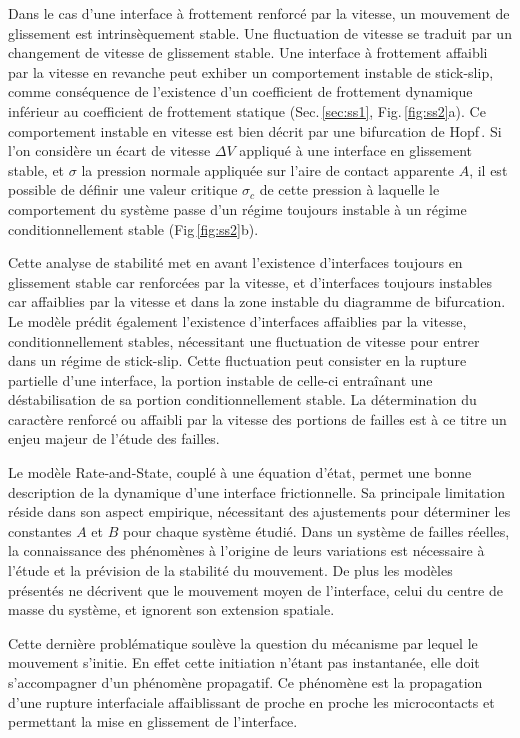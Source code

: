 Dans le cas d'une interface à frottement renforcé par la vitesse, un mouvement de glissement est intrinsèquement stable. Une fluctuation de vitesse se traduit par un changement de vitesse de glissement stable. Une interface à frottement affaibli par la vitesse en revanche peut exhiber un comportement instable de stick-slip, comme conséquence de l'existence d'un coefficient de frottement dynamique inférieur au coefficient de frottement statique (Sec.\,\ref{sec:ss1}, Fig.\,\ref{fig:ss2}a). Ce comportement instable en vitesse est bien décrit par une bifurcation de Hopf\,\cite{rice_stability_1983,gu_slip_1984,heslot_creep_1994}. Si l'on considère un écart de vitesse $\Delta V$ appliqué à une interface en glissement stable, et $\sigma$ la pression normale appliquée sur l'aire de contact apparente $A$, il est possible de définir une valeur critique $\sigma_c$ de cette pression à laquelle le comportement du système passe d'un régime toujours instable à un régime conditionnellement stable (Fig\,\ref{fig:ss2}b).


Cette analyse de stabilité met en avant l'existence d'interfaces toujours en glissement stable car renforcées par la vitesse, et d'interfaces toujours instables car affaiblies par la vitesse et dans la zone instable du diagramme de bifurcation. Le modèle prédit également l'existence d'interfaces affaiblies par la vitesse, conditionnellement stables, nécessitant une fluctuation de vitesse pour entrer dans un régime de stick-slip. Cette fluctuation peut consister en la rupture partielle d'une interface, la portion instable de celle-ci entraînant une déstabilisation de sa portion conditionnellement stable. La détermination du caractère renforcé ou affaibli par la vitesse des portions de failles est à ce titre un enjeu majeur de l'étude des failles.




Le modèle Rate-and-State, couplé à une équation d'état, permet une bonne description de la dynamique d'une interface frictionnelle. Sa principale limitation réside dans son aspect empirique, nécessitant des ajustements pour déterminer les constantes $A$ et $B$ pour chaque système étudié. Dans un système de failles réelles, la connaissance des phénomènes à l'origine de leurs variations est nécessaire à l'étude et la prévision de la stabilité du mouvement. De plus les modèles présentés ne décrivent que le mouvement moyen de l'interface, celui du centre de masse du système, et ignorent son extension spatiale.

Cette dernière problématique soulève la question du mécanisme par lequel le mouvement s'initie. En effet cette initiation n'étant pas instantanée, elle doit s'accompagner d'un phénomène propagatif. Ce phénomène est la propagation d'une rupture interfaciale affaiblissant de proche en proche les microcontacts et permettant la mise en glissement de l'interface.



